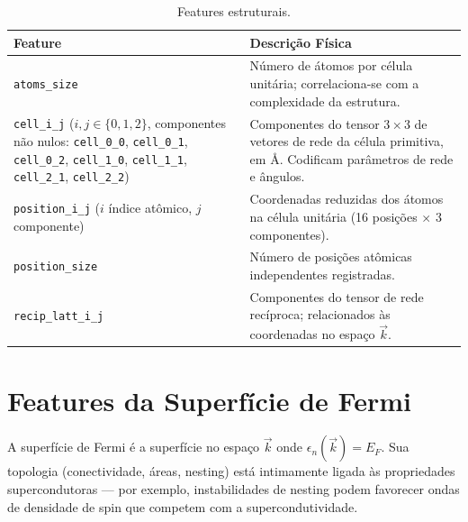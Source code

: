 \documentclass[12pt, a4paper, oneside]{report}
\begin{document}
\begin{table}[H]
    \centering
    \caption{Features estruturais.}
    \begin{tabular}{lp{10cm}}
        \toprule
        \textbf{Feature} & \textbf{Descrição Física} \\
        \midrule
        \texttt{atoms\_size} & Número de átomos por célula unitária; correlaciona-se com a complexidade da estrutura. \\
        \texttt{cell\_i\_j} ($i,j \in \{0,1,2\}$, componentes não nulos: \texttt{cell\_0\_0}, \texttt{cell\_0\_1}, \texttt{cell\_0\_2}, \texttt{cell\_1\_0}, \texttt{cell\_1\_1}, \texttt{cell\_2\_1}, \texttt{cell\_2\_2}) & Componentes do tensor $3\times 3$ de vetores de rede da célula primitiva, em \AA. Codificam parâmetros de rede e ângulos. \\
        \texttt{position\_i\_j} ($i$ índice atômico, $j$ componente) & Coordenadas reduzidas dos átomos na célula unitária (16 posições $\times$ 3 componentes). \\
        \texttt{position\_size} & Número de posições atômicas independentes registradas. \\
        \texttt{recip\_latt\_i\_j} & Componentes do tensor de rede recíproca; relacionados às coordenadas no espaço $\vec{k}$. \\
        \bottomrule
    \end{tabular}
\end{table}

\section{Features da Superfície de Fermi}

A superfície de Fermi é a superfície no espaço $\vec{k}$ onde $\epsilon_n(\vec{k}) = E_F$. Sua topologia (conectividade, áreas, nesting) está intimamente ligada às propriedades supercondutoras --- por exemplo, instabilidades de nesting podem favorecer ondas de densidade de spin que competem com a supercondutividade.
\end{document}
